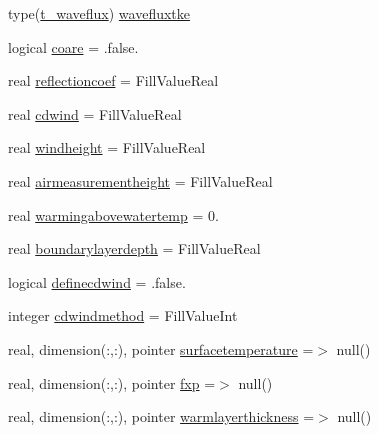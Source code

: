 \begin{DoxyCompactItemize}
type(\mbox{\hyperlink{structmoduleinterfacewaterair_1_1t__waveflux}{t\+\_\+waveflux}}) \mbox{\hyperlink{structmoduleinterfacewaterair_1_1t__interfacewaterair_a29ddca3f8d9e503026620b126cef15e1}{wavefluxtke}}
\item 
logical \mbox{\hyperlink{structmoduleinterfacewaterair_1_1t__interfacewaterair_aeb93efbad162f0096bf291069e9f0c4e}{coare}} = .false.
\item 
real \mbox{\hyperlink{structmoduleinterfacewaterair_1_1t__interfacewaterair_af25b5f2b31284db6c58781a1230fd177}{reflectioncoef}} = Fill\+Value\+Real
\item 
real \mbox{\hyperlink{structmoduleinterfacewaterair_1_1t__interfacewaterair_a987a44ef9468e27eb8d68b4a61fe8304}{cdwind}} = Fill\+Value\+Real
\item 
real \mbox{\hyperlink{structmoduleinterfacewaterair_1_1t__interfacewaterair_a02c1c266136d185bde9c53697cdd77f4}{windheight}} = Fill\+Value\+Real
\item 
real \mbox{\hyperlink{structmoduleinterfacewaterair_1_1t__interfacewaterair_a1044a03b5da21056e34613829bce7651}{airmeasurementheight}} = Fill\+Value\+Real
\item 
real \mbox{\hyperlink{structmoduleinterfacewaterair_1_1t__interfacewaterair_a0e078b45d344a84a0a416cc3547c5274}{warmingabovewatertemp}} = 0.
\item 
real \mbox{\hyperlink{structmoduleinterfacewaterair_1_1t__interfacewaterair_a0bb0008891d8c5bc04c537b4fb14cfce}{boundarylayerdepth}} = Fill\+Value\+Real
\item 
logical \mbox{\hyperlink{structmoduleinterfacewaterair_1_1t__interfacewaterair_a3141c10c53e1a1f1bb2b05fedf4cafb1}{definecdwind}} = .false.
\item 
integer \mbox{\hyperlink{structmoduleinterfacewaterair_1_1t__interfacewaterair_ac54ebe77d74f0298703df9ed8ab6d656}{cdwindmethod}} = Fill\+Value\+Int
\item 
real, dimension(\+:,\+:), pointer \mbox{\hyperlink{structmoduleinterfacewaterair_1_1t__interfacewaterair_a45ae472e512aff1e3d3ab57e0c3b8d18}{surfacetemperature}} =$>$ null()
\item 
real, dimension(\+:,\+:), pointer \mbox{\hyperlink{structmoduleinterfacewaterair_1_1t__interfacewaterair_ab1762af83f6ffd38fcd4b811b377ef16}{fxp}} =$>$ null()
\item 
real, dimension(\+:,\+:), pointer \mbox{\hyperlink{structmoduleinterfacewaterair_1_1t__interfacewaterair_a03e6d1ab429e6501c0c76e34f2dd1edb}{warmlayerthickness}} =$>$ null()
\item 

\end{DoxyCompactItemize}

